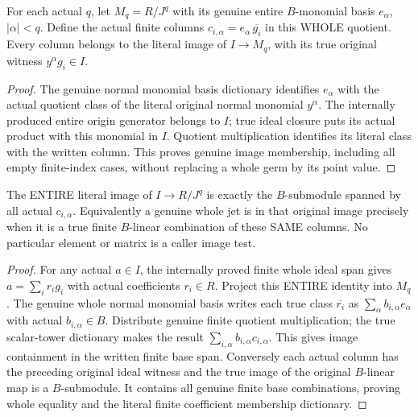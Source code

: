 \begin{theorem}
\label{hir:relative-normal-original-jet-actual-columns}
\leanok
{}
For each actual $q$, let $M_q=R/J^q$ with its genuine entire $B$-monomial basis
$e_\alpha$, $|\alpha|<q$. Define the actual finite columns
$c_{i,\alpha}=e_\alpha\,\overline{g_i}$ in this WHOLE quotient.
Every column belongs to the literal image of $I\to M_q$, with its true
original witness $y^\alpha g_i\in I$.
\end{theorem}
\begin{proof}
The genuine normal monomial basis dictionary identifies $e_\alpha$ with the
actual quotient class of the literal original normal monomial $y^\alpha$.
The internally produced entire origin generator belongs to $I$; true ideal
closure puts its actual product with this monomial in $I$. Quotient
multiplication identifies its literal class with the written column.
This proves genuine image membership, including all empty finite-index cases,
without replacing a whole germ by its point value.
\end{proof}

\begin{theorem}
\label{hir:relative-normal-original-jet-entire-image-span}
\leanok
{}
The ENTIRE literal image of $I\to R/J^q$ is exactly the $B$-submodule spanned
by all actual $c_{i,\alpha}$. Equivalently a genuine whole jet is in that
original image precisely when it is a true finite $B$-linear combination of
these SAME columns. No particular element or matrix is a caller image test.
\end{theorem}
\begin{proof}
For any actual $a\in I$, the internally proved finite whole ideal span gives
$a=\sum_i r_i g_i$ with actual coefficients $r_i\in R$. Project this ENTIRE
identity into $M_q$. The genuine whole normal monomial basis writes each true
class $\overline{r_i}$ as $\sum_\alpha b_{i,\alpha} e_\alpha$ with actual
$b_{i,\alpha}\in B$. Distribute genuine finite quotient multiplication; the
true scalar-tower dictionary makes the result
$\sum_{i,\alpha}b_{i,\alpha} c_{i,\alpha}$. This gives image containment in
the written finite base span. Conversely each actual column has the preceding
original ideal witness and the true image of the original $B$-linear map is
a $B$-submodule. It contains all genuine finite base combinations, proving
whole equality and the literal finite coefficient membership dictionary.
\end{proof}

